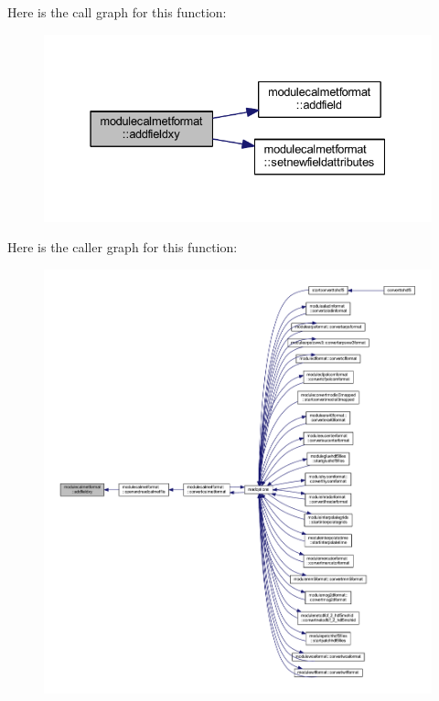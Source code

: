 Here is the call graph for this function\+:\nopagebreak
\begin{figure}[H]
\begin{center}
\leavevmode
\includegraphics[width=331pt]{namespacemodulecalmetformat_a620b75749d8d431ee5f1c9152211ebb0_cgraph}
\end{center}
\end{figure}
Here is the caller graph for this function\+:\nopagebreak
\begin{figure}[H]
\begin{center}
\leavevmode
\includegraphics[width=350pt]{namespacemodulecalmetformat_a620b75749d8d431ee5f1c9152211ebb0_icgraph}
\end{center}
\end{figure}
\mbox{\label{namespacemodulecalmetformat_a26c3210caedd039907d56c2a6b8d30c4}} 
